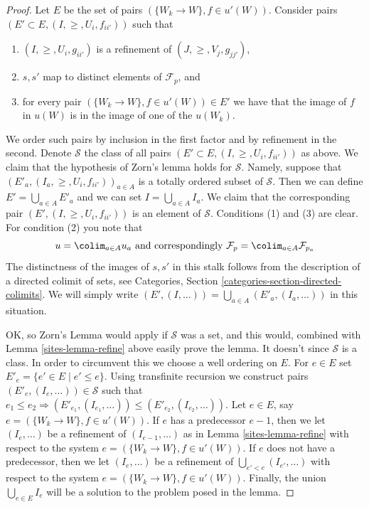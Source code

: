 \begin{proof}

Let $E$ be the set of pairs $(\{W_k \to W\}, f\in u'(W))$.
Consider pairs $(E' \subset E, (I, \geq, U_i, f_{ii'}))$
such that
\begin{enumerate}
\item $(I, \geq, U_i, g_{ii'})$ is a refinement of $(J, \geq, V_j, g_{jj'})$,
\item $s, s'$ map to distinct elements of $\mathcal{F}_p$, and
\item for every pair $(\{W_k \to W\}, f\in u'(W)) \in E'$ we have that
the image of $f$ in $u(W)$ is in the image of one of the $u(W_k)$.
\end{enumerate}
We order such pairs by inclusion in the first factor and
by refinement in the second. Denote $\mathcal{S}$ the class
of all pairs $(E' \subset E, (I, \geq, U_i, f_{ii'}))$ as above.
We claim that the hypothesis of Zorn's lemma holds for $\mathcal{S}$. Namely,
suppose that $(E'_a, (I_a, \geq, U_i, f_{ii'}))_{a \in A}$
is a totally ordered subset of $\mathcal{S}$. Then we can define
$E' = \bigcup_{a \in A} E'_a$ and we can set $I = \bigcup_{a \in A} I_a$.
We claim that the corresponding pair
$(E' , (I, \geq, U_i, f_{ii'}))$ is an element of $\mathcal{S}$.
Conditions (1) and (3) are clear. For condition (2) you note
that
$$
u = \colim_{a \in A} u_a
\text{ and correspondingly }
\mathcal{F}_p = \colim_{a \in A} \mathcal{F}_{p_a}
$$
The distinctness of the images of $s, s'$ in this stalk follows
from the description of a directed colimit of sets, see
Categories, Section \ref{categories-section-directed-colimits}.
We will simply write
$(E', (I, \ldots)) = \bigcup_{a \in A}(E'_a, (I_a, \ldots))$
in this situation.

\medskip\noindent
OK, so Zorn's Lemma would apply if $\mathcal{S}$ was a set,
and this would, combined with Lemma \ref{sites-lemma-refine} above easily prove
the lemma. It doesn't since $\mathcal{S}$ is a class. In order
to circumvent this we choose a well ordering on $E$.
For $e \in E$ set $E'_e = \{e' \in E \mid e' \leq e\}$.
Using transfinite recursion we construct pairs
$(E'_e, (I_e, \ldots)) \in \mathcal{S}$ such that
$e_1 \leq e_2 \Rightarrow (E'_{e_1}, (I_{e_1}, \ldots))
\leq (E'_{e_2}, (I_{e_2}, \ldots))$.
Let $e \in E$, say $e = (\{W_k \to W\}, f\in u'(W))$.
If $e$ has a predecessor $e - 1$, then we let
$(I_e, \ldots)$ be a refinement of $(I_{e - 1}, \ldots)$
as in Lemma \ref{sites-lemma-refine} with respect to the system
$e = (\{W_k \to W\}, f\in u'(W))$.
If $e$ does not have a predecessor, then we let
$(I_e, \ldots)$ be a refinement of $\bigcup_{e' < e} (I_{e'}, \ldots)$
with respect to the system
$e = (\{W_k \to W\}, f\in u'(W))$.
Finally, the union $\bigcup_{e \in E} I_e$ will be a solution to
the problem posed in the lemma.
\end{proof}

